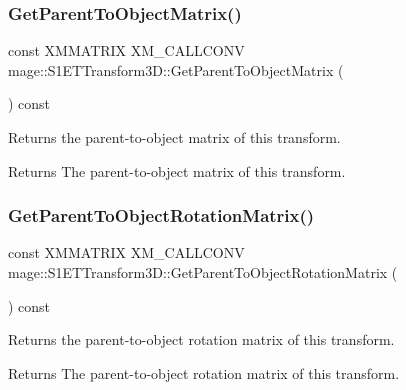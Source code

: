 \subsubsection{\texorpdfstring{Get\+Parent\+To\+Object\+Matrix()}{GetParentToObjectMatrix()}}
{\footnotesize\ttfamily const X\+M\+M\+A\+T\+R\+IX X\+M\+\_\+\+C\+A\+L\+L\+C\+O\+NV mage\+::\+S1\+E\+T\+Transform3\+D\+::\+Get\+Parent\+To\+Object\+Matrix (\begin{DoxyParamCaption}{ }\end{DoxyParamCaption}) const\hspace{0.3cm}{\ttfamily [noexcept]}}

Returns the parent-\/to-\/object matrix of this transform.

\begin{DoxyReturn}{Returns}
The parent-\/to-\/object matrix of this transform. 
\end{DoxyReturn}
\mbox{\label{classmage_1_1_s1_e_t_transform3_d_ac794348bd010547cdb3c6f108812d0e9}} 
\subsubsection{\texorpdfstring{Get\+Parent\+To\+Object\+Rotation\+Matrix()}{GetParentToObjectRotationMatrix()}}
{\footnotesize\ttfamily const X\+M\+M\+A\+T\+R\+IX X\+M\+\_\+\+C\+A\+L\+L\+C\+O\+NV mage\+::\+S1\+E\+T\+Transform3\+D\+::\+Get\+Parent\+To\+Object\+Rotation\+Matrix (\begin{DoxyParamCaption}{ }\end{DoxyParamCaption}) const\hspace{0.3cm}{\ttfamily [noexcept]}}

Returns the parent-\/to-\/object rotation matrix of this transform.

\begin{DoxyReturn}{Returns}
The parent-\/to-\/object rotation matrix of this transform. 
\end{DoxyReturn}
\mbox{\label{classmage_1_1_s1_e_t_transform3_d_a52dfb00eecfe8ae6f6f672b6a5822952}} 
